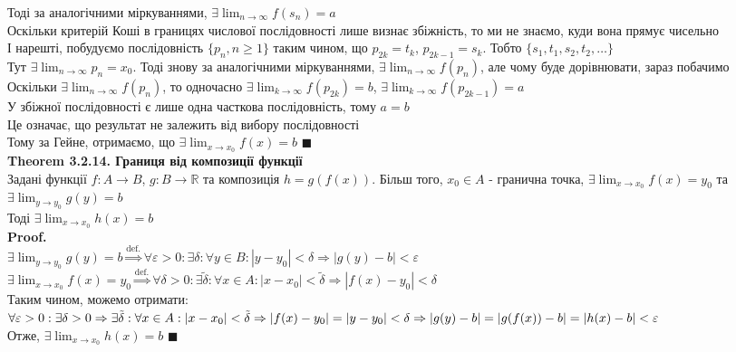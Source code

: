 \documentclass[a4paper, 14pt]{extarticle}
\def\huge{\displaystyle}
\def\bigline{\vspace{5mm}\\}
\def\th#1{\textbf{Theorem {#1}}}
\def\proof{\textbf{Proof.}\\}
\def\bigline{\vspace{5mm}\\}
\def\qed{$\blacksquare$}
\begin{document}
Тоді за аналогічними міркуваннями, $\exists \huge \lim_{n \to \infty} f(s_n) = a$\\
Оскільки критерій Коші в границях числової послідовності лише визнає збіжність, то ми не знаємо, куди вона прямує чисельно
\bigline
І нарешті, побудуємо послідовність $\{p_n, n \geq 1\}$ таким чином, що $p_{2k} = t_k$, $p_{2k-1} = s_k$. Тобто $\{s_1, t_1, s_2, t_2, \dots \}$\\
Тут $\exists \huge \lim_{n \to \infty} p_n = x_0$. Тоді знову за аналогічними міркуваннями, $\exists \huge \lim_{n \to \infty} f(p_n)$, але чому буде дорівнювати, зараз побачимо\\
Оскільки $\exists \huge \lim_{n \to \infty} f(p_n)$, то одночасно $\exists \huge \lim_{k \to \infty} f(p_{2k}) = b$, $\exists \huge \lim_{k \to \infty} f(p_{2k-1}) = a$\\
У збіжної послідовності є лише одна часткова послідовність, тому $a = b$\\
Це означає, що результат не залежить від вибору послідовності\\
Тому за Гейне, отримаємо, що $\exists \huge \lim_{x \to x_0} f(x) = b$ \qed
\bigline
\th{3.2.14. Границя від композиції функції}\\
Задані функції $f: A \to B$, $g: B \to \mathbb{R}$ та композиція $h = g(f(x))$. Більш того, $x_0 \in A$ - гранична точка, $\exists \huge \lim_{x \to x_0} f(x) = y_0$ та $\exists \huge \lim_{y \to y_0} g(y) = b$\\
Тоді $\exists \huge \lim_{x \to x_0} h(x) = b$\\
\proof
$\exists \huge \lim_{y \to y_0} g(y) = b \overset{\textrm{def.}}{\Rightarrow} \forall \varepsilon > 0: \exists \delta: \forall y \in B: |y-y_0|<\delta \Rightarrow |g(y)-b|<\varepsilon$\\
$\exists \huge \lim_{x \to x_0} f(x) = y_0 \overset{\textrm{def.}}{\Rightarrow} \forall \delta > 0: \exists \tilde{\delta}: \forall x \in A: |x-x_0|<\tilde{\delta} \Rightarrow |f(x)-y_0|<\delta$\\
Таким чином, можемо отримати:\\
$\forall \varepsilon > 0: \exists \delta > 0 \Rightarrow \exists \tilde{\delta}: \forall x \in A: |x-x_0| < \tilde{\delta} \Rightarrow \\ |f(x)-y_0| = |y-y_0|<\delta \Rightarrow |g(y)-b|=|g(f(x))-b| = |h(x)-b|<\varepsilon$\\
Отже, $\exists \huge \lim_{x \to x_0} h(x) = b$ \qed
\bigline
\end{document}
